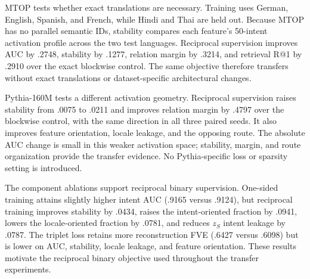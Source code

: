 MTOP tests whether exact translations are necessary. Training uses German, English, Spanish, and French, while Hindi and Thai are held out. Because MTOP has no parallel semantic IDs, stability compares each feature's 50-intent activation profile across the two test languages. Reciprocal supervision improves AUC by .2748, stability by .1277, relation margin by .3214, and retrieval R@1 by .2910 over the exact blockwise control. The same objective therefore transfers without exact translations or dataset-specific architectural changes.

Pythia-160M tests a different activation geometry. Reciprocal supervision raises stability from .0075 to .0211 and improves relation margin by .4797 over the blockwise control, with the same direction in all three paired seeds. It also improves feature orientation, locale leakage, and the opposing route. The absolute AUC change is small in this weaker activation space; stability, margin, and route organization provide the transfer evidence. No Pythia-specific loss or sparsity setting is introduced.

The component ablations support reciprocal binary supervision. One-sided training attains slightly higher intent AUC (.9165 versus .9124), but reciprocal training improves stability by .0434, raises the intent-oriented fraction by .0941, lowers the locale-oriented fraction by .0781, and reduces $z_S$ intent leakage by .0787. The triplet loss retains more reconstruction FVE (.6427 versus .6098) but is lower on AUC, stability, locale leakage, and feature orientation. These results motivate the reciprocal binary objective used throughout the transfer experiments.
